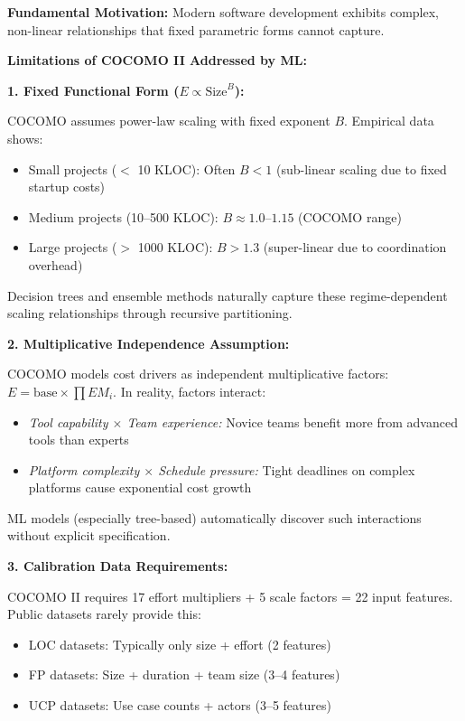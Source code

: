 \documentclass[11pt,a4paper]{article}
\begin{document}
\textbf{Fundamental Motivation:} Modern software development exhibits complex, non-linear relationships that fixed parametric forms cannot capture.

\textbf{Limitations of COCOMO II Addressed by ML:}

\textbf{1. Fixed Functional Form ($E \propto \text{Size}^B$):}

COCOMO assumes power-law scaling with fixed exponent $B$. Empirical data shows:
\begin{itemize}
    \item Small projects ($<$ 10 KLOC): Often $B < 1$ (sub-linear scaling due to fixed startup costs)
    \item Medium projects (10--500 KLOC): $B \approx 1.0$--$1.15$ (COCOMO range)
    \item Large projects ($>$ 1000 KLOC): $B > 1.3$ (super-linear due to coordination overhead)
\end{itemize}

Decision trees and ensemble methods naturally capture these regime-dependent scaling relationships through recursive partitioning.

\textbf{2. Multiplicative Independence Assumption:}

COCOMO models cost drivers as independent multiplicative factors: $E = \text{base} \times \prod EM_i$. In reality, factors interact:
\begin{itemize}
    \item \textit{Tool capability $\times$ Team experience:} Novice teams benefit more from advanced tools than experts
    \item \textit{Platform complexity $\times$ Schedule pressure:} Tight deadlines on complex platforms cause exponential cost growth
\end{itemize}

ML models (especially tree-based) automatically discover such interactions without explicit specification.

\textbf{3. Calibration Data Requirements:}

COCOMO II requires 17 effort multipliers + 5 scale factors = 22 input features. Public datasets rarely provide this:
\begin{itemize}
    \item LOC datasets: Typically only size + effort (2 features)
    \item FP datasets: Size + duration + team size (3--4 features)
    \item UCP datasets: Use case counts + actors (3--5 features)
\end{itemize}
\end{document}
